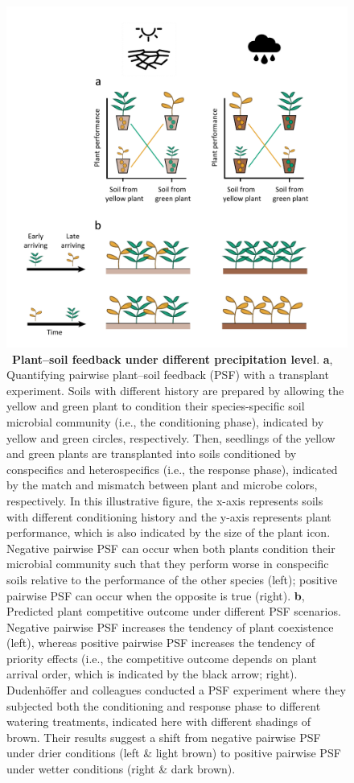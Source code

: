 \documentclass[hidelinks,letterpaper, 11pt]{article}
\begin{document}
\clearpage
\begin{figure}[h]
	\vspace{-1.5cm}
	\centering
	\includegraphics[width=0.75\linewidth]{../Figures/Figure1_ver6}
	\caption{\, \textbf{Plant--soil feedback under different precipitation level}. 
	\textbf{a}, Quantifying pairwise plant--soil feedback (PSF) with a transplant experiment. 
	Soils with different history are prepared by allowing the yellow and green plant to condition their species-specific soil microbial community (i.e., the conditioning phase), indicated by yellow and green circles, respectively. 
	Then, seedlings of the yellow and green plants are transplanted into soils conditioned by conspecifics and heterospecifics (i.e., the response phase), indicated by the match and mismatch between plant and microbe colors, respectively. 
	In this illustrative figure, the x-axis represents soils with different conditioning history and the y-axis represents plant performance, which is also indicated by the size of the plant icon.
	Negative pairwise PSF can occur when both plants condition their microbial community such that they perform worse in conspecific soils relative to the performance of the other species (left); positive pairwise PSF can occur when the opposite is true (right).
	\textbf{b}, Predicted plant competitive outcome under different PSF scenarios. 
	Negative pairwise PSF increases the tendency of plant coexistence (left), whereas positive pairwise PSF increases the tendency of priority effects (i.e., the competitive outcome depends on plant arrival order, which is indicated by the black arrow; right).
	Dudenh{\"o}ffer and colleagues \citep{Dudenhoffer2022} conducted a PSF experiment where they subjected both the conditioning and response phase to different watering treatments, indicated here with different shadings of brown. 
	Their results suggest a shift from negative pairwise PSF under drier conditions (left \& light brown) to positive pairwise PSF under wetter conditions (right \& dark brown).}	
	\label{fig:PSFconceptual} 
\end{figure}
\end{document}
